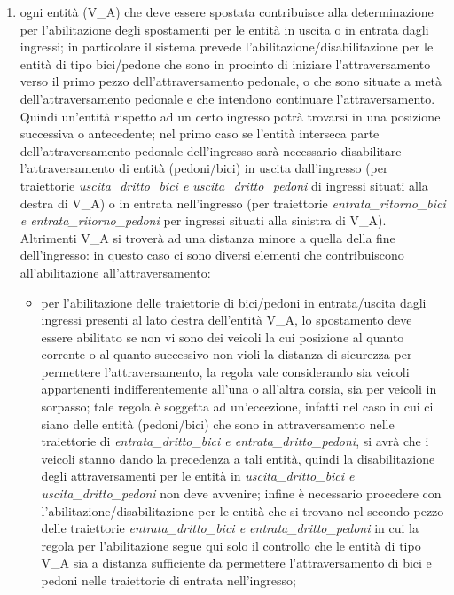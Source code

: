 \begin{enumerate}
\begin{enumerate}
\item ogni entità (V\_A) che deve essere spostata contribuisce alla determinazione per l'abilitazione degli spostamenti per le entità in uscita o in entrata dagli ingressi; in particolare il sistema prevede l'abilitazione/disabilitazione per le entità di tipo bici/pedone che sono in procinto di iniziare l'attraversamento verso il primo pezzo dell'attraversamento pedonale, o che sono situate a metà dell'attraversamento pedonale e che intendono continuare l'attraversamento. Quindi un'entità rispetto ad un certo ingresso potrà trovarsi in una posizione successiva o antecedente; nel primo caso se l'entità interseca parte dell'attraversamento pedonale dell'ingresso sarà necessario disabilitare l'attraversamento di entità (pedoni/bici) in uscita dall'ingresso (per traiettorie \textit{usci\-ta\_drit\-to\_bi\-ci e usci\-ta\_drit\-to\_pe\-do\-ni} di ingressi situati alla destra di V\_A) o in entrata nell'ingresso (per traiettorie \textit{en\-tra\-ta\_ri\-tor\-no\_bi\-ci e en\-tra\-ta\_ri\-tor\-no\_pe\-do\-ni} per ingressi situati alla sinistra di V\_A). Altrimenti V\_A si troverà ad una distanza minore a quella della fine dell'ingresso: in questo caso ci sono diversi elementi che contribuiscono all'abilitazione all'attraversamento:
\begin{itemize}
\item per l'abilitazione delle traiettorie di bici/pedoni in entrata/uscita dagli ingressi presenti al lato destra dell'entità V\_A, lo spostamento deve essere abilitato se non vi sono dei veicoli la cui posizione al quanto corrente o al quanto successivo non violi la distanza di sicurezza per permettere l'attraversamento, la regola vale considerando sia veicoli appartenenti indifferentemente all'una o all'altra corsia, sia per veicoli in sorpasso; tale regola è soggetta ad un'eccezione, infatti nel caso in cui ci siano delle entità (pedoni/bici) che sono in attraversamento nelle traiettorie di \textit{en\-tra\-ta\_drit\-to\_bi\-ci e en\-tra\-ta\_drit\-to\_pe\-do\-ni}, si avrà che i veicoli stanno dando la precedenza a tali entità, quindi la disabilitazione degli attraversamenti per le entità in \textit{usci\-ta\_drit\-to\_bi\-ci e usci\-ta\_drit\-to\_pe\-do\-ni} non deve avvenire; infine è necessario procedere con l'abilitazione/disabilitazione per le entità che si trovano nel secondo pezzo delle traiettorie \textit{en\-tra\-ta\_drit\-to\_bi\-ci e en\-tra\-ta\_drit\-to\_pe\-do\-ni} in cui la regola per l'abilitazione segue qui solo il controllo che le entità di tipo V\_A sia a distanza sufficiente da permettere l'attraversamento di bici e pedoni nelle traiettorie di entrata nell'ingresso;

\end{itemize}
\end{enumerate}
\end{enumerate}
